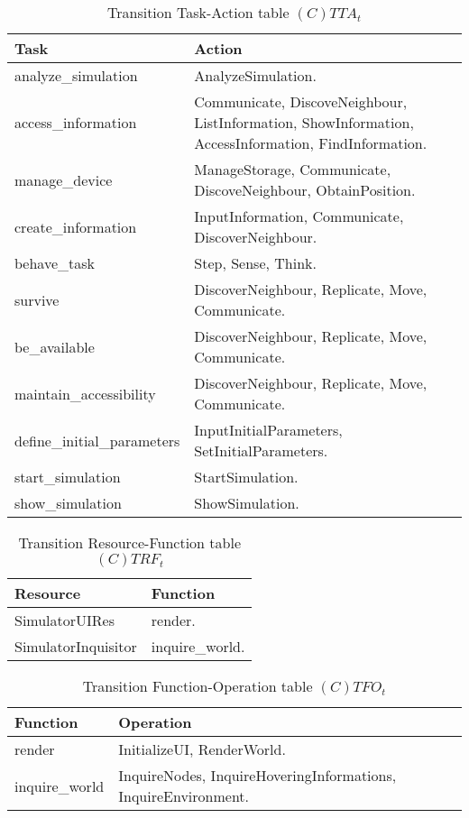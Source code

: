 \begin{table}[H]
	\centering
	\begin{tabular}{|p{4cm}|p{8cm}|}
			\hline
			\textbf{Task} & \textbf{Action} \\
			\hline
			analyze\_simulation & AnalyzeSimulation. \\
			\hline
			access\_information & Communicate, DiscoveNeighbour, ListInformation,
			ShowInformation, AccessInformation, FindInformation.\\
			\hline
			manage\_device & ManageStorage, Communicate, DiscoveNeighbour,
			ObtainPosition. \\
			\hline
			create\_information & InputInformation, Communicate, DiscoverNeighbour. \\
			\hline
			behave\_task & Step, Sense, Think. \\
			\hline
			survive & DiscoverNeighbour, Replicate, Move, Communicate. \\
			\hline
			be\_available & DiscoverNeighbour, Replicate, Move, Communicate. \\
			\hline
			maintain\_accessibility & DiscoverNeighbour, Replicate, Move, Communicate. \\
			\hline
			define\_initial\_parameters & InputInitialParameters, SetInitialParameters. \\
			\hline
			start\_simulation & StartSimulation. \\
			\hline
			show\_simulation & ShowSimulation. \\
			\hline
		\end{tabular}
	\caption{Transition Task-Action table $(C)TTA_t$}
	\label{tab:cttat}
\end{table}

\begin{table}[H]
	\centering
	\begin{tabular}{|p{4cm}|p{8cm}|}
			\hline
			\textbf{Resource} & \textbf{Function} \\
			\hline
			SimulatorUIRes & render. \\
			\hline
			SimulatorInquisitor & inquire\_world. \\
			\hline
		\end{tabular}
	\caption{Transition Resource-Function table $(C)TRF_t$}
	\label{tab:ctrft}
\end{table}

\begin{table}[H]
	\centering
	\begin{tabular}{|p{4cm}|p{8cm}|}
			\hline
			\textbf{Function} & \textbf{Operation} \\
			\hline
			render & InitializeUI, RenderWorld. \\
			\hline
			inquire\_world & InquireNodes, InquireHoveringInformations, InquireEnvironment. \\
			\hline
		\end{tabular}
	\caption{Transition Function-Operation table $(C)TFO_t$}
	\label{tab:ctfot}
\end{table}

